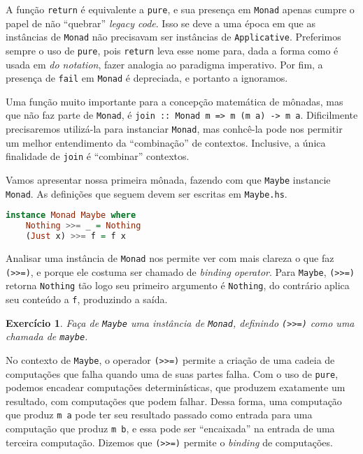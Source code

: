 \documentclass[a4paper]{article}
\newtheorem{exercicio}{Exercício}
\begin{document}
A função \texttt{return} é equivalente a \texttt{pure}, e sua presença em \texttt{Monad} apenas cumpre o papel de não ``quebrar'' \emph{legacy code}.
Isso se deve a uma época em que as instâncias de \texttt{Monad} não precisavam ser instâncias de \texttt{Applicative}.
Preferimos sempre o uso de \texttt{pure}, pois \texttt{return} leva esse nome para, dada a forma como é usada em \emph{do notation}, fazer analogia ao paradigma imperativo.
Por fim, a presença de \texttt{fail} em \texttt{Monad} é depreciada, e portanto a ignoramos.

Uma função muito importante para a concepção matemática de mônadas, mas que não faz parte de \texttt{Monad}, é \texttt{join :: Monad m => m (m a) -> m a}.
Dificilmente precisaremos utilizá-la para instanciar \texttt{Monad}, mas conhcê-la pode nos permitir um melhor entendimento da ``combinação'' de contextos.
Inclusive, a única finalidade de \texttt{join} é ``combinar'' contextos.

Vamos apresentar nossa primeira mônada, fazendo com que \texttt{Maybe} instancie \texttt{Monad}.
As definições que seguem devem ser escritas em \texttt{Maybe.hs}.

\begin{lstlisting}[language=haskell, frame=single]
instance Monad Maybe where
	Nothing >>= _ = Nothing
	(Just x) >>= f = f x
\end{lstlisting}

Analisar uma instância de \texttt{Monad} nos permite ver com mais clareza o que faz \texttt{(>>=)}, e porque ele costuma ser chamado de \emph{binding operator}.
Para \texttt{Maybe}, \texttt{(>>=)} retorna \texttt{Nothing} tão logo seu primeiro argumento é \texttt{Nothing}, do contrário aplica seu conteúdo a \texttt{f}, produzindo a saída.

\begin{exercicio}
	Faça de \emph{\texttt{Maybe}} uma instância de \emph{\texttt{Monad}}, definindo \emph{\texttt{(>>=)}} como uma chamada de \emph{\texttt{maybe}}.
\end{exercicio}

No contexto de \texttt{Maybe}, o operador \texttt{(>>=)} permite a criação de uma cadeia de computações que falha quando uma de suas partes falha.
Com o uso de \texttt{pure}, podemos encadear computações determinísticas, que produzem exatamente um resultado, com computações que podem falhar.
Dessa forma, uma computação que produz \texttt{m a} pode ter seu resultado passado como entrada para uma computação que produz \texttt{m b}, e essa pode ser ``encaixada'' na entrada de uma terceira computação.
Dizemos que \texttt{(>>=)} permite o \emph{binding} de computações.
\end{document}
